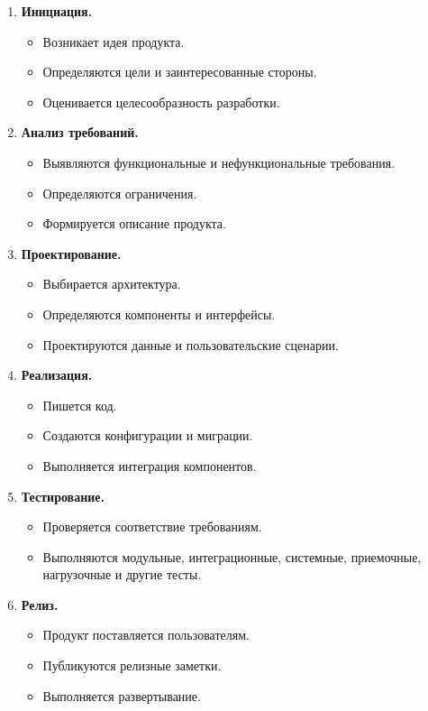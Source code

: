 \documentclass[12pt,a4paper]{article}
\begin{document}
\begin{enumerate}
    \item \textbf{Инициация.}
    \begin{itemize}
        \item Возникает идея продукта.
        \item Определяются цели и заинтересованные стороны.
        \item Оценивается целесообразность разработки.
    \end{itemize}

    \item \textbf{Анализ требований.}
    \begin{itemize}
        \item Выявляются функциональные и нефункциональные требования.
        \item Определяются ограничения.
        \item Формируется описание продукта.
    \end{itemize}

    \item \textbf{Проектирование.}
    \begin{itemize}
        \item Выбирается архитектура.
        \item Определяются компоненты и интерфейсы.
        \item Проектируются данные и пользовательские сценарии.
    \end{itemize}

    \item \textbf{Реализация.}
    \begin{itemize}
        \item Пишется код.
        \item Создаются конфигурации и миграции.
        \item Выполняется интеграция компонентов.
    \end{itemize}

    \item \textbf{Тестирование.}
    \begin{itemize}
        \item Проверяется соответствие требованиям.
        \item Выполняются модульные, интеграционные, системные, приемочные, нагрузочные и другие тесты.
    \end{itemize}

    \item \textbf{Релиз.}
    \begin{itemize}
        \item Продукт поставляется пользователям.
        \item Публикуются релизные заметки.
        \item Выполняется развертывание.
    \end{itemize}


\end{enumerate}
\end{document}
